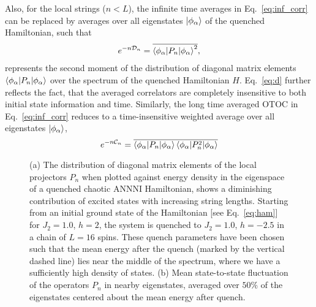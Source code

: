 \documentclass[aps,prx,twocolumn]{revtex4-2}
\begin{document}
Also, for the local strings ($n<L$), the  {infinite} time averages in Eq.~\eqref{eq:inf_corr} can be replaced by averages over all eigenstates $\ket{\phi_{\alpha}}$ of the quenched Hamiltonian, such that 
\begin{eqnarray}\label{eq:d}
e^{-n\mathcal{D}_n}=\overline{\braket{\phi_{\alpha}|P_n|\phi_{\alpha}}^2},
\end{eqnarray}
represents the second moment of the distribution of diagonal matrix elements $\braket{\phi_{\alpha}|P_n|\phi_{\alpha}}$ over the spectrum of the quenched Hamiltonian $H$. Eq.~\eqref{eq:d} further reflects the fact, that the averaged correlators are completely insensitive to both initial state information and time. Similarly, the long time averaged OTOC in Eq.~\eqref{eq:inf_corr} reduces to a time-insensitive weighted average over all eigenstates $\ket{\phi_{\alpha}}$,
\begin{equation}
e^{-n\mathcal{C}_n}=\overline{\braket{\phi_{\alpha}|P_n|\phi_{\alpha}}\braket{\phi_{\alpha}|P_n^2|\phi_{\alpha}}}
\end{equation}
\begin{figure*}
	\hspace{1.5cm}
	
	
	\caption{(a) The distribution of diagonal matrix elements of the local projectors $P_n$ when plotted against energy density in the eigenspace of a quenched chaotic ANNNI Hamiltonian, shows a diminishing contribution of excited states with increasing string lengths. Starting from an initial ground state of the Hamiltonian [see Eq.~\eqref{eq:ham}] for $J_2=1.0$, $h=2$, the system is quenched to $J_2=1.0$, $h=-2.5$ in a chain of $L=16$ spins. These quench parameters have been chosen such that the mean energy after the quench (marked by the vertical dashed line) lies near the middle of the spectrum, where we have a sufficiently high density of states. (b) Mean state-to-state fluctuation of the operators $P_n$ in nearby eigenstates, averaged over $50\%$ of the eigenstates centered about the mean energy after quench.}
	\label{dist}
\end{figure*}
\end{document}
